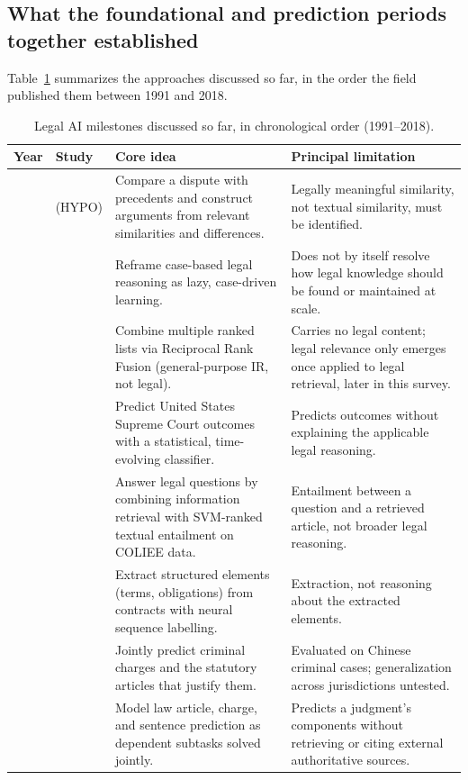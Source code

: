 \subsection{What the foundational and prediction periods together established}

Table~\ref{tab:foundational} summarizes the approaches discussed so far, in the order the field
published them between 1991 and 2018.

\begin{table}[tp]
\centering
\caption{Legal AI milestones discussed so far, in chronological order (1991--2018).}
\label{tab:foundational}
\footnotesize
\setlength{\tabcolsep}{5pt}
\renewcommand{\arraystretch}{1.25}
\begin{tabularx}{\textwidth}{>{\raggedright\arraybackslash}p{1.6cm} >{\raggedright\arraybackslash}p{2.9cm} >{\raggedright\arraybackslash}X >{\raggedright\arraybackslash}X}
\toprule
\textbf{Year} & \textbf{Study} & \textbf{Core idea} & \textbf{Principal limitation} \\
\midrule
1991 & \citet{ashley1991} (HYPO) & Compare a dispute with precedents and construct arguments from relevant similarities and differences. & Legally meaningful similarity, not textual similarity, must be identified. \\
2003 & \citet{ashley2003} & Reframe case-based legal reasoning as lazy, case-driven learning. & Does not by itself resolve how legal knowledge should be found or maintained at scale. \\
2009 & \citet{cormack2009} & Combine multiple ranked lists via Reciprocal Rank Fusion (general-purpose IR, not legal). & Carries no legal content; legal relevance only emerges once applied to legal retrieval, later in this survey. \\
2014 & \citet{katz2014} & Predict United States Supreme Court outcomes with a statistical, time-evolving classifier. & Predicts outcomes without explaining the applicable legal reasoning. \\
2014 & \citet{kim2014} & Answer legal questions by combining information retrieval with SVM-ranked textual entailment on COLIEE data. & Entailment between a question and a retrieved article, not broader legal reasoning. \\
2017 & \citet{chalkidis2017} & Extract structured elements (terms, obligations) from contracts with neural sequence labelling. & Extraction, not reasoning about the extracted elements. \\
2017 & \citet{luo2017} & Jointly predict criminal charges and the statutory articles that justify them. & Evaluated on Chinese criminal cases; generalization across jurisdictions untested. \\
2018 & \citet{zhong2018} & Model law article, charge, and sentence prediction as dependent subtasks solved jointly. & Predicts a judgment's components without retrieving or citing external authoritative sources. \\
\bottomrule
\end{tabularx}
\end{table}

